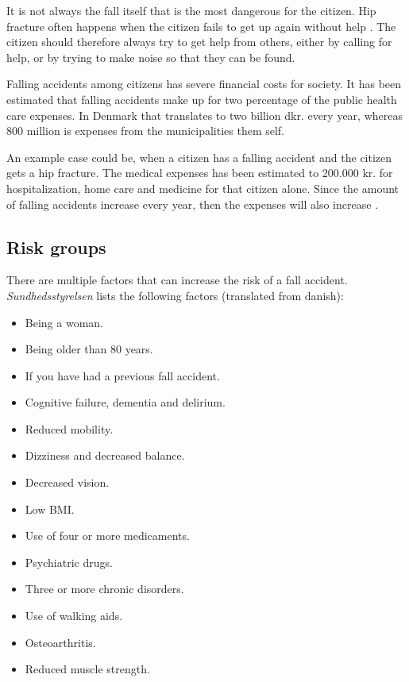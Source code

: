 It is not always the fall itself that is the most dangerous for the citizen. Hip fracture often happens when the citizen fails to get up again without help \cite{CekuraFald}. The citizen should therefore always try to get help from others, either by calling for help, or by trying to make noise so that they can be found.

Falling accidents among citizens has severe financial costs for society. It has been estimated that falling accidents make up for two percentage of the public health care expenses. In Denmark that translates to two billion dkr. every year, whereas 800 million is expenses from the municipalities them self.

An example case could be, when a citizen has a falling accident and the citizen gets a hip fracture. The medical expenses has been estimated to 200.000 kr. for hospitalization, home care and medicine for that citizen alone. Since the amount of falling accidents increase every year, then the expenses will also increase \cite{MagasinetSundhed:Pris}.

\subsection{Risk groups}
There are multiple factors that can increase the risk of a fall accident. \textit{Sundhedsstyrelsen} \cite{FaldArtikel} lists the following factors (translated from danish):

\begin{itemize}
    \item Being a woman.
    \item Being older than 80 years.
    \item If you have had a previous fall accident.
    \item Cognitive failure, dementia and delirium.
    \item Reduced mobility.
    \item Dizziness and decreased balance.
    \item Decreased vision.
    \item Low BMI.
    \item Use of four or more medicaments.
    \item Psychiatric drugs.
    \item Three or more chronic disorders.
    \item Use of walking aids.
    \item Osteoarthritis.
    \item Reduced muscle strength.
\end{itemize}

